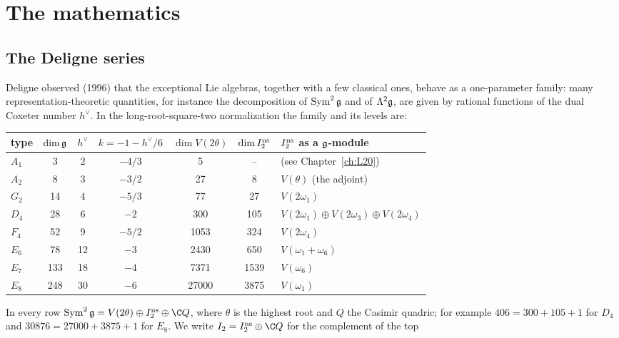 \section{The mathematics}\label{l24:sec:math}

\subsection{The Deligne series}

Deligne observed (1996) that the exceptional Lie algebras, together with a few classical ones, behave
as a one-parameter family: many representation-theoretic quantities, for instance the decomposition of
$\operatorname{Sym}^2\mathfrak g$ and of $\Lambda^2\mathfrak g$, are given by rational functions of
the dual Coxeter number $h^\vee$. In the long-root-square-two normalization the family and its levels
are:
\begin{center}\small
\begin{tabular}{lcccccl}
\toprule
type & $\dim\mathfrak g$ & $h^\vee$ & $k=-1-h^\vee/6$ & $\dim V(2\theta)$ & $\dim I_2^{\mathrm{ns}}$ & $I_2^{\mathrm{ns}}$ as a $\mathfrak g$-module\\
\midrule
$A_1$ & 3 & 2 & $-4/3$ & 5 & -- & (see Chapter~\ref{ch:L20}) \\
$A_2$ & 8 & 3 & $-3/2$ & 27 & 8 & $V(\theta)$ (the adjoint)\\
$G_2$ & 14 & 4 & $-5/3$ & 77 & 27 & $V(2\omega_1)$\\
$D_4$ & 28 & 6 & $-2$ & 300 & 105 & $V(2\omega_1)\oplus V(2\omega_3)\oplus V(2\omega_4)$\\
$F_4$ & 52 & 9 & $-5/2$ & 1053 & 324 & $V(2\omega_4)$\\
$E_6$ & 78 & 12 & $-3$ & 2430 & 650 & $V(\omega_1+\omega_6)$\\
$E_7$ & 133 & 18 & $-4$ & 7371 & 1539 & $V(\omega_6)$\\
$E_8$ & 248 & 30 & $-6$ & 27000 & 3875 & $V(\omega_1)$\\
\bottomrule
\end{tabular}
\end{center}
In every row $\operatorname{Sym}^2\ltwentyfourg=V(2\theta)\oplus\ltwentyfourIns\oplus\C Q$, where $\theta$
is the highest root and $Q$ the Casimir quadric; for example $406=300+105+1$ for $D_4$ and
$30876=27000+3875+1$ for $E_8$. We write $I_2=\ltwentyfourIns\oplus\C Q$ for the complement of the top
